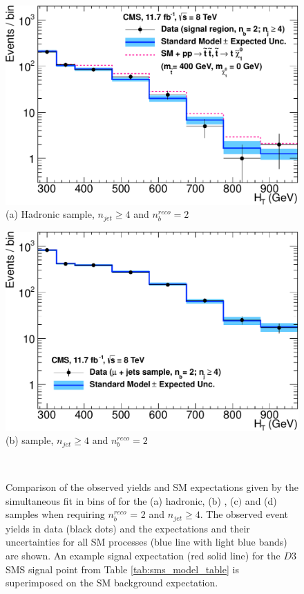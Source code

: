 \begin{figure}[ht]
\footnotesize
\centering
\begin{minipage}[b]{0.48 \linewidth}
\includegraphics[width = 1.0\linewidth]{plots/hadronic_2b_ge4j_logy.pdf}
\centering (a)  Hadronic sample, $n_{jet} \geq 4$ and $n_{b}^{reco} = 2$ 
\end{minipage}
\quad
\begin{minipage}[b]{0.48\linewidth}
\includegraphics[width = 1.0\linewidth]{plots/muon_2b_ge4j_logy.pdf}
\centering (b)  \mupjets sample, $n_{jet} \geq 4$ and $n_{b}^{reco} = 2$  
\end{minipage} \\
\caption[Comparison of the observed yields and \ac{SM} expectations given by the simultaneous fit in bins of \theht for the (a) hadronic, (b) \mupjets, (c$)$ \dimupjets and (d) \gpjets samples when requiring $n_{b}^{reco}$ = 2 and $n_{jet} \geq 4$.]{Comparison of the observed yields and \ac{SM} expectations given by the simultaneous fit in bins of \theht for the (a) hadronic, (b) \mupjets, (c$)$ \dimupjets and (d) \gpjets samples when requiring $n_{b}^{reco}$ = 2 and $n_{jet} \geq 4$. The observed event yields in data (black dots) and the expectations and their uncertainties for all SM processes (blue line with light blue bands) are shown. An example signal expectation (red solid line) for the $D3$ \ac{SMS} signal point from Table \ref{tab:sms_model_table} is superimposed on the \ac{SM} background expectation.}
\label{fig:result2bhigh}
\end{figure}

